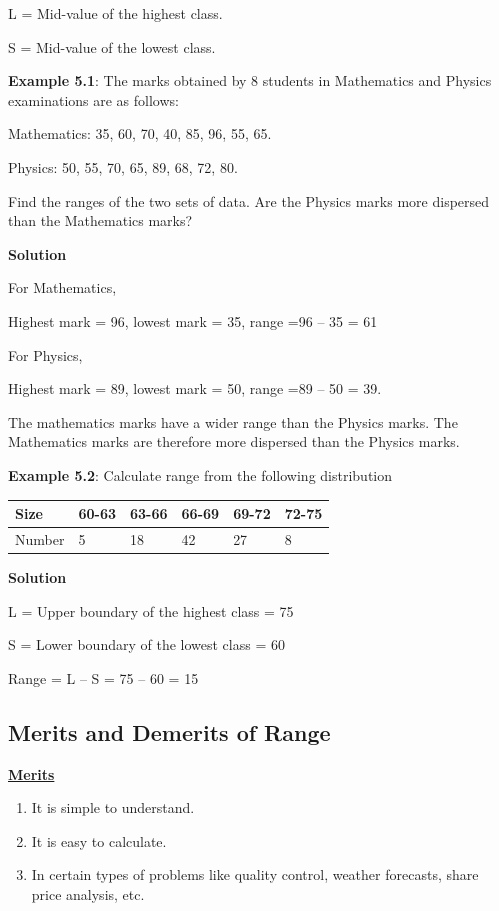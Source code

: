 \documentclass[
]{book}
\begin{document}
L = Mid-value of the highest class.

S = Mid-value of the lowest class.

\textbf{Example 5.1}: The marks obtained by 8 students in Mathematics and
Physics examinations are as follows:

Mathematics: 35, 60, 70, 40, 85, 96, 55, 65.

Physics: 50, 55, 70, 65, 89, 68, 72, 80.

Find the ranges of the two sets of data. Are the Physics marks more
dispersed than the Mathematics marks?

\textbf{Solution}

For Mathematics,

Highest mark = 96, lowest mark = 35, range =96 -- 35 = 61

For Physics,

Highest mark = 89, lowest mark = 50, range =89 -- 50 = 39.

The mathematics marks have a wider range than the Physics marks. The
Mathematics marks are therefore more dispersed than the Physics marks.

\textbf{Example 5.2}: Calculate range from the following distribution

\begin{longtable}[]{@{}llllll@{}}
\toprule
Size & 60-63 & 63-66 & 66-69 & 69-72 & 72-75 \\
\midrule
\endhead
Number & 5 & 18 & 42 & 27 & 8 \\
\bottomrule
\end{longtable}

\textbf{Solution}

L = Upper boundary of the highest class = 75

S = Lower boundary of the lowest class = 60

Range = L -- S = 75 -- 60 = 15

\hypertarget{merits-and-demerits-of-range}{%
\subsection{Merits and Demerits of Range}\label{merits-and-demerits-of-range}}

\textbf{\underline{Merits}}

\begin{enumerate}
\def\labelenumi{\arabic{enumi}.}
\item
  It is simple to understand.
\item
  It is easy to calculate.
\item
  In certain types of problems like quality control, weather
  forecasts, share price analysis, etc.
\end{enumerate}
\end{document}
